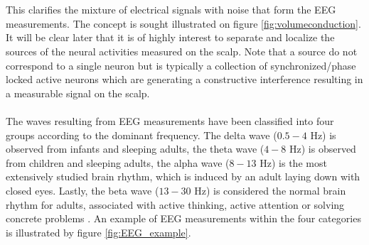\\ \\
This clarifies the mixture of electrical signals with noise that form the EEG measurements. 
The concept is sought illustrated on figure \ref{fig:volumeconduction}. 
\\
It will be clear later that it is of highly interest to separate and localize the sources of the neural activities measured on the scalp. 
Note that a source do not correspond to a single neuron but is typically a collection of synchronized/phase locked active neurons which are generating a constructive interference resulting in a measurable signal on the scalp.     
\\ \\
The waves resulting from EEG measurements have been classified into four groups according to the dominant frequency. 
The delta wave ($0.5-4$ Hz) is observed from infants and sleeping adults, the theta wave ($4-8$ Hz) is observed from children and sleeping adults, the alpha wave ($8-13$ Hz) is the most extensively studied brain rhythm, which is induced by an adult laying down with closed eyes. 
Lastly, the beta wave ($13-30$ Hz) is considered the normal brain rhythm for adults, associated with active thinking, active attention or solving concrete problems \cite[p. 11]{EEGsignalprocessing}. 
An example of EEG measurements within the four categories is illustrated by figure \ref{fig:EEG_example}.        
